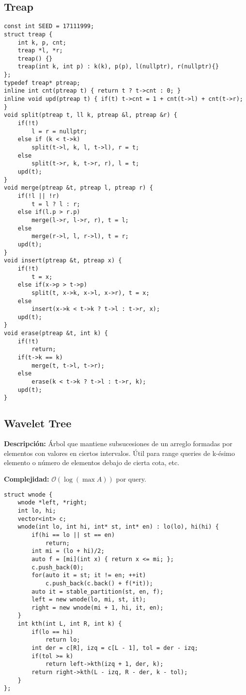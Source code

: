 \documentclass[twocolumn]{article}
\begin{document}
\subsection{Treap}
\lstset{basicstyle=\footnotesize\ttfamily,breaklines=true,tabsize=2,language=C++,frame=leftline, numbers=left, numberstyle=\tiny, numbersep=5pt}
\begin{lstlisting}
const int SEED = 17111999;
struct treap {
	int k, p, cnt;
	treap *l, *r;
	treap() {}
	treap(int k, int p) : k(k), p(p), l(nullptr), r(nullptr){}
};
typedef treap* ptreap;
inline int cnt(ptreap t) { return t ? t->cnt : 0; }
inline void upd(ptreap t) { if(t) t->cnt = 1 + cnt(t->l) + cnt(t->r); }
void split(ptreap t, ll k, ptreap &l, ptreap &r) {
	if(!t)
		l = r = nullptr;
	else if (k < t->k)
		split(t->l, k, l, t->l), r = t;
	else
		split(t->r, k, t->r, r), l = t;
	upd(t);
}
void merge(ptreap &t, ptreap l, ptreap r) {
	if(!l || !r)
		t = l ? l : r;
	else if(l.p > r.p)
		merge(l->r, l->r, r), t = l;
	else
		merge(r->l, l, r->l), t = r;
	upd(t);
}
void insert(ptreap &t, ptreap x) {
	if(!t)
		t = x;
	else if(x->p > t->p)
		split(t, x->k, x->l, x->r), t = x;
	else
		insert(x->k < t->k ? t->l : t->r, x);
	upd(t);
}
void erase(ptreap &t, int k) {
	if(!t)
		return;
	if(t->k == k)
		merge(t, t->l, t->r);
	else
		erase(k < t->k ? t->l : t->r, k);
	upd(t);
}
\end{lstlisting}
\subsection{Wavelet Tree}
\begin{footnotesize}{\bf Descripción:} Árbol que mantiene subsucesiones de un arreglo formadas por elementos con valores en ciertos intervalos. Útil para range queries de k-ésimo elemento o número de elementos debajo de cierta cota, etc.


{\bf Complejidad:} $\mathcal{O}(\log(\max A))$ por query.
\end{footnotesize}\lstset{basicstyle=\footnotesize\ttfamily,breaklines=true,tabsize=2,language=C++,frame=leftline, numbers=left, numberstyle=\tiny, numbersep=5pt}
\begin{lstlisting}
struct wnode {
	wnode *left, *right;
	int lo, hi;
	vector<int> c;
	wnode(int lo, int hi, int* st, int* en) : lo(lo), hi(hi) {
		if(hi == lo || st == en)
			return;
		int mi = (lo + hi)/2;
		auto f = [mi](int x) { return x <= mi; };
		c.push_back(0);
		for(auto it = st; it != en; ++it)
			c.push_back(c.back() + f(*it));
		auto it = stable_partition(st, en, f);
		left = new wnode(lo, mi, st, it);
		right = new wnode(mi + 1, hi, it, en);
	}
	int kth(int L, int R, int k) {
		if(lo == hi)
			return lo;
		int der = c[R], izq = c[L - 1], tol = der - izq;
		if(tol >= k)
			return left->kth(izq + 1, der, k);
		return right->kth(L - izq, R - der, k - tol);
	}
};
\end{lstlisting}
\end{document}
